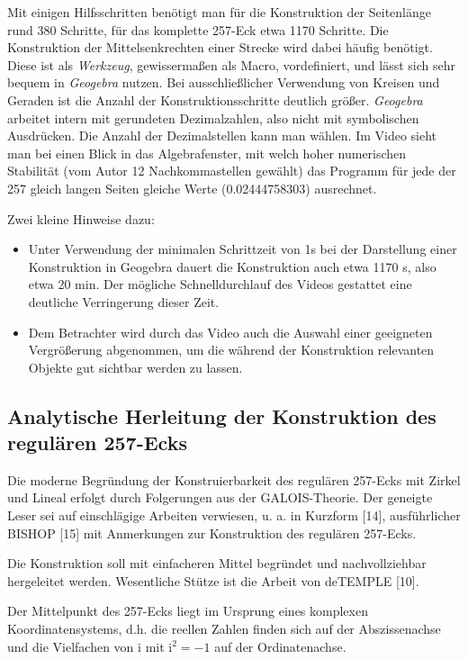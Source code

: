 \documentclass[11pt]{article}
\newcommand{\ii}{\mathrm{i}}
\begin{document}
Mit einigen Hilfsschritten benötigt man für die Konstruktion der Seitenlänge
rund 380 Schritte, für das komplette 257-Eck etwa 1170 Schritte. Die
Konstruktion der Mittelsenkrechten einer Strecke wird dabei häufig benötigt.
Diese ist als \emph{Werkzeug}, gewissermaßen als Macro, vordefiniert, und
lässt sich sehr bequem in \emph{Geogebra} nutzen. Bei ausschließlicher
Verwendung von Kreisen und Geraden ist die Anzahl der Konstruktionsschritte
deutlich größer. \emph{Geogebra} arbeitet intern mit gerundeten Dezimalzahlen,
also nicht mit symbolischen Ausdrücken. Die Anzahl der Dezimalstellen kann man
wählen. Im Video sieht man bei einen Blick in das Algebrafenster, mit welch
hoher numerischen Stabilität (vom Autor 12 Nachkommastellen gewählt) das
Programm für jede der 257 gleich langen Seiten gleiche Werte (0.02444758303)
ausrechnet.

Zwei kleine Hinweise dazu:
\begin{itemize}[noitemsep]
\item Unter Verwendung der minimalen Schrittzeit von 1s bei der Darstellung
  einer Konstruktion in Geogebra dauert die Konstruktion auch etwa 1170 s,
  also etwa 20 min. Der mögliche Schnelldurchlauf des Videos gestattet eine
  deutliche Verringerung dieser Zeit.
\item Dem Betrachter wird durch das Video auch die Auswahl einer geeigneten
  Vergrößerung abgenommen, um die während der Konstruktion relevanten Objekte
  gut sichtbar werden zu lassen.
\end{itemize}

\subsection*{Analytische Herleitung der Konstruktion des regulären 257-Ecks}

Die moderne Begründung der Konstruierbarkeit des regulären 257-Ecks mit Zirkel
und Lineal erfolgt durch Folgerungen aus der GALOIS-Theorie. Der geneigte
Leser sei auf einschlägige Arbeiten verwiesen, u. a. in Kurzform [14],
ausführlicher BISHOP [15] mit Anmerkungen zur Konstruktion des regulären
257-Ecks.

Die Konstruktion soll mit einfacheren Mittel begründet und nachvollziehbar
hergeleitet werden. Wesentliche Stütze ist die Arbeit von deTEMPLE [10].

Der Mittelpunkt des 257-Ecks liegt im Ursprung eines komplexen
Koordinatensystems, d.h. die reellen Zahlen finden sich auf der Abszissenachse
und die Vielfachen von $\ii$ mit $\ii^{2}=-1$ auf der Ordinatenachse.
\end{document}
